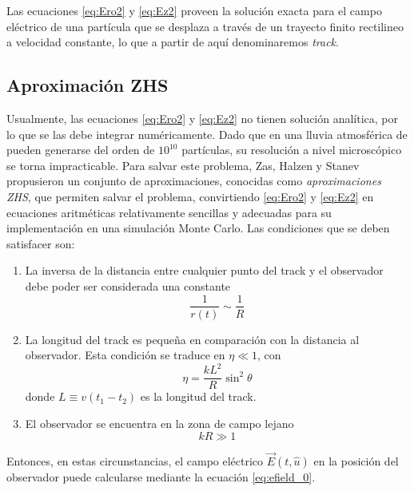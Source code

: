 Las ecuaciones \ref{eq:Ero2} y \ref{eq:Ez2} proveen la soluci\'on exacta para el campo el\'ectrico de una part\'icula que se desplaza a trav\'es de un trayecto finito rectilineo a velocidad constante, lo que a partir de aqu\'i denominaremos \emph{track}.

\subsection{Aproximaci\'on ZHS}
\label{sbsc:zhs_approx}

Usualmente, las ecuaciones \ref{eq:Ero2} y \ref{eq:Ez2} no tienen soluci\'on anal\'itica, por lo que se las debe integrar num\'ericamente.
Dado que en una lluvia atmosf\'erica de  pueden generarse del orden de $10^{10}$ part\'iculas, su resoluci\'on a nivel microsc\'opico se torna impracticable.
Para salvar este problema, Zas, Halzen y Stanev~\cite{1_zas_halzen_stanev_1991,2_zas_halzen_stanev_1992} propusieron un conjunto de aproximaciones, conocidas como \emph{aproximaciones ZHS}, que permiten salvar el problema, convirtiendo \ref{eq:Ero2} y \ref{eq:Ez2} en ecuaciones aritm\'eticas relativamente sencillas y adecuadas para su implementaci\'on en una simulaci\'on Monte Carlo. Las condiciones que se deben satisfacer son:
	\begin{enumerate}
		\item La inversa de la distancia entre cualquier punto del track y el observador debe poder ser considerada una constante
		\begin{equation}
		\frac{1}{r(t)}\sim\frac{1}{R}
		\end{equation}
		\item La longitud del track es peque\~na en comparaci\'on con la distancia al observador. Esta condici\'on se traduce en $\eta\ll1$, con
		\begin{equation}
		\eta = \frac{k L^2}{R}\sin^2\theta
		\end{equation}
		donde $L\equiv v(t_1-t_2)$ es la longitud del track.
		\item El observador se encuentra en la zona de campo lejano
		\begin{equation}
		kR\gg1
		\end{equation}
	\end{enumerate}
	Entonces, en estas circunstancias, el campo el\'ectrico $\vec{E}(t,\hat{u})$ en la posici\'on del observador puede calcularse mediante la ecuaci\'on \ref{eq:efield_0}.
